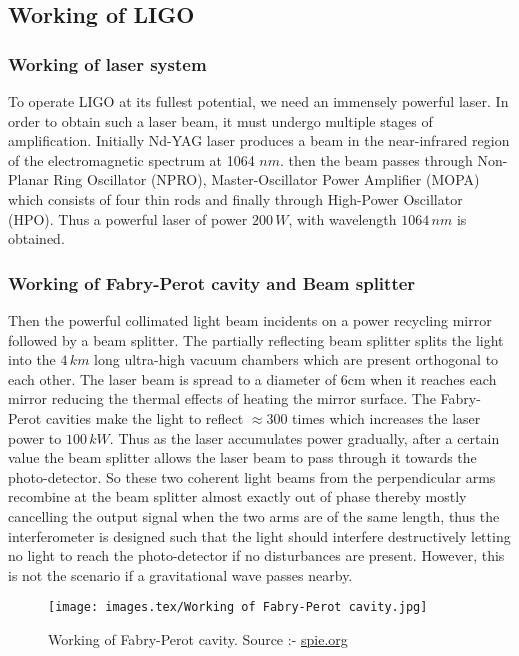 \subsection{Working of LIGO}

\subsubsection{Working of laser system}

To operate LIGO at its fullest potential, we need an immensely powerful laser. In order to obtain such a laser beam, it must undergo multiple stages of amplification. Initially Nd-YAG laser produces a beam in the near-infrared region of the electromagnetic spectrum at 1064 $nm$. then the beam passes through Non-Planar Ring Oscillator (NPRO), Master-Oscillator Power Amplifier (MOPA) which consists of four thin rods and finally through High-Power Oscillator (HPO). Thus a powerful laser of power $200\,W$, with wavelength $1064\,nm$ is obtained. 

\subsubsection{Working of Fabry-Perot cavity and Beam splitter}

Then the powerful collimated light beam incidents on a power recycling mirror followed by a beam splitter. The partially reflecting beam splitter splits the light into the $4\,km$ long ultra-high vacuum chambers which are present orthogonal to each other. The laser beam is spread to a diameter of 6cm when it reaches each mirror reducing the thermal effects of heating the mirror surface. The Fabry-Perot cavities make the light to reflect $\approx 300$ times which increases the laser power to $100\,kW$. Thus as the laser accumulates power gradually, after a certain value the beam splitter allows the laser beam to pass through it towards the photo-detector. So these two coherent light beams from the perpendicular arms recombine at the beam splitter almost exactly out of phase thereby mostly cancelling the output signal when the two arms are of the same length, thus the interferometer is designed such that the light should interfere destructively letting no light to reach the photo-detector if no disturbances are present. However, this is not the scenario if a gravitational wave passes nearby.

\begin{figure}[h]
    \centering
    \texttt{[image: images.tex/Working of Fabry-Perot cavity.jpg]}
    \caption{Working of Fabry-Perot cavity. Source :- \href{https://spie.org/news/ligo-researchers-design-complex-device-to-detect-infinitesimal-changes?SSO=1}{spie.org}}
\end{figure}

